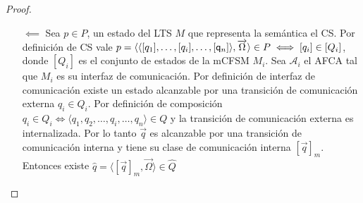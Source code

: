 \begin{proof}
\begin{itemize}
    \item[$\impliedby$] Sea $p \in P$, un estado del LTS $M$ que representa la semántica el CS. Por definición de CS vale $p = \langle \langle [q_1],\ldots,[q_i], \ldots, [\mathsf{q}_n] \rangle, \overrightarrow{\Omega} \rangle \in P \iff [q_i] \in [Q_i]$, donde $[Q_i]$ es el conjunto de estados de la mCFSM $M_i$. Sea $\mathcal{A}_i$ el AFCA tal que $M_i$ es su interfaz de comunicación. Por definición de interfaz de comunicación existe un estado alcanzable por una transición de comunicación externa $q_i \in Q_i$. Por definición de composición $q_i \in Q_i \iff \langle q_1, q_2, \ldots, q_i, \ldots, q_n \rangle \in Q$ y la transición de comunicación externa es internalizada. Por lo tanto $\overrightarrow{q}$ es alcanzable por una transición de comunicación interna y tiene su clase de comunicación interna $[\overrightarrow{q}]_m$. Entonces existe $\widehat{q} = \langle [\overrightarrow{q}]_m, \overrightarrow{\Omega} \rangle \in \widehat{Q}$
\end{itemize}
\end{proof}

